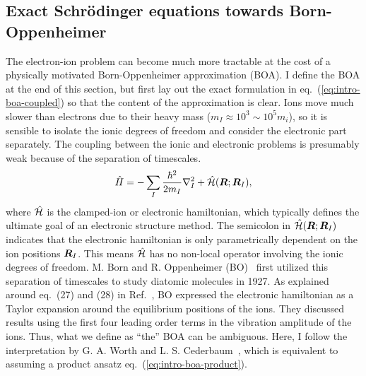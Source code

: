 \subsection{Exact Schr\"odinger equations towards Born-Oppenheimer}
The electron-ion problem can become much more tractable at the cost of a physically motivated Born-Oppenheimer approximation (BOA). I define the BOA at the end of this section, but first lay out the exact formulation in eq.~(\ref{eq:intro-boa-coupled}) so that the content of the approximation is clear.
Ions move much slower than electrons due to their heavy mass ($m_I\approx 10^3\sim 10^5 m_i$), so it is sensible to isolate the ionic degrees of freedom and consider the electronic part separately. The coupling between the ionic and electronic problems is presumably weak because of the separation of timescales.
\begin{align} \label{eq:intro-ei-to-e-ham}
\hat{H} = -\sum_I \frac{\hbar^2}{2m_I} \nabla^2_I
+ \hat{\mathcal{H}}(\boldsymbol{R};\boldsymbol{R}_I),
\end{align}
where $\hat{\mathcal{H}}$ is the clamped-ion or electronic hamiltonian, which typically defines the ultimate goal of an electronic structure method. The semicolon in $\hat{\mathcal{H}}(\boldsymbol{R};\boldsymbol{R}_I)$ indicates that the electronic hamiltonian is only parametrically dependent on the ion positions $\boldsymbol{R}_I$. This means $\hat{\mathcal{H}}$ has no non-local operator involving the ionic degrees of freedom. M. Born and R. Oppenheimer (BO)~\cite{Born1927} first utilized this separation of timescales to study diatomic molecules in 1927. As explained around eq.~(27) and (28) in Ref.~\cite{Born1927}, BO expressed the electronic hamiltonian as a Taylor expansion around the equilibrium positions of the ions. They discussed results using the first four leading order terms in the vibration amplitude of the ions. Thus, what we define as ``the'' BOA can be ambiguous. Here, I follow the interpretation by G. A. Worth and L. S. Cederbaum~\cite{Worth2004}, which is equivalent to assuming a product ansatz eq.~(\ref{eq:intro-boa-product}).



